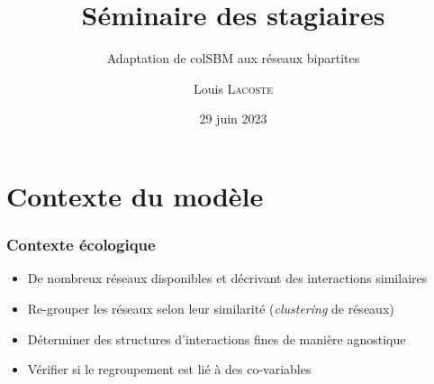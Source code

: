 \documentclass{beamer}
\title{Séminaire des stagiaires}
\subtitle{Adaptation de colSBM aux réseaux bipartites}
\author[L. Lacoste]{Louis \textsc{Lacoste}}
\date{29 juin 2023}
\begin{document}
\begin{frame}
\maketitle
\end{frame}

\section{Contexte du modèle}
\begin{frame}
    \frametitle{Contexte écologique}
    \begin{itemize}
        \item De nombreux réseaux disponibles \parencite{WebLifeEcological} et décrivant des interactions similaires
        \item Re-grouper les réseaux selon leur similarité (\emph{clustering} de réseaux)
        \item Déterminer des structures d'interactions fines de manière agnostique
        \item Vérifier si le regroupement est lié à des co-variables
    \end{itemize}
\end{frame}
\end{document}
